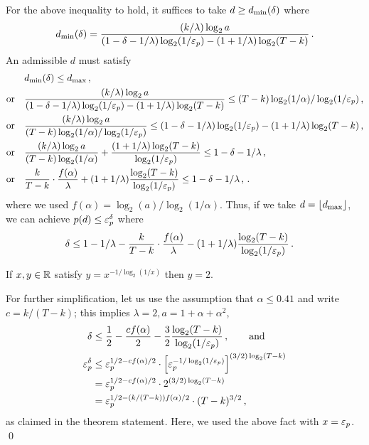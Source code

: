   For the above inequality to hold, 
  it suffices to take $d \geq d_\mathrm{min}(\delta)$ where 
  $$
    d_\mathrm{min}(\delta) = \frac{(k/\lambda) \log_2 a}{(1 - \delta - 1/\lambda) \log_2(1/\mathsf{\varepsilon}_p) - (1+1/\lambda) \log_2(T - k)}
    \,.
  $$
  An admissible $d$ must satisfy
  \begin{align*}
    &d_\mathrm{min}(\delta) \leq d_\mathrm{max} \,,\\
    \text{or}\quad &      
      \frac{(k/\lambda) \log_2 a}{(1 - \delta - 1/\lambda) \log_2(1/\mathsf{\varepsilon}_p) - (1+1/\lambda) \log_2(T - k)}
        \leq (T - k) \log_2(1/\alpha)/\log_2(1/\mathsf{\varepsilon}_p) \,,\\
    \text{or}\quad &      
      \frac{(k/\lambda) \log_2 a}{(T - k) \log_2(1/\alpha)/\log_2(1/\mathsf{\varepsilon}_p)} 
        \leq (1 - \delta - 1/\lambda) \log_2(1/\mathsf{\varepsilon}_p) - (1+1/\lambda) \log_2(T - k) \,,\\
    \text{or}\quad &      
      \frac{(k/\lambda) \log_2 a}{(T - k) \log_2(1/\alpha)} + \frac{(1+1/\lambda) \log_2(T - k)}{\log_2(1/\mathsf{\varepsilon}_p)}
        \leq 1 - \delta - 1/\lambda  \,,\\
    \text{or}\quad &      
      \frac{k}{T-k}\cdot \frac{f(\alpha)}{\lambda} + (1+1/\lambda) \frac{ \log_2(T - k)}{\log_2(1/\mathsf{\varepsilon}_p)}
        \leq 1 - \delta - 1/\lambda  \,,
        \,.
  \end{align*}
  where we used $f(\alpha) = \log_2(a)/\log_2(1/\alpha)$. 
  Thus, if we take $d = \lfloor d_\mathrm{max} \rfloor$, we can achieve  $p(d) \leq \mathsf{\varepsilon}_p^{\delta}$ 
  where 
  \begin{align}
    \delta
      &\leq 1 - 1/\lambda - \frac{k}{T-k}\cdot \frac{f(\alpha)}{\lambda} - (1+1/\lambda) \frac{ \log_2(T - k)}{\log_2(1/\mathsf{\varepsilon}_p)}\,. \label{eq:delta}    
  \end{align}


  \begin{fact*}
    If $x,y \in \mathbb{R}$ satisfy $y = x^{-1/\log_2(1/x)}$ then $y = 2$.
  \end{fact*}
  \noindent
  For further simplification, let us use the assumption that $\alpha \leq 0.41$ 
  and write $c = k/(T-k)$; 
  this implies $\lambda = 2, a = 1 + \alpha + \alpha^2$, 
  \begin{align*}
    \delta
      &\leq \frac{1}{2} - \frac{c f(\alpha)}{2} - \frac{3}{2} \frac{ \log_2(T - k)}{\log_2(1/\mathsf{\varepsilon}_p)}\,, 
      \qquad \text{and}\\
    \mathsf{\varepsilon}_p^\delta  
      &\leq \mathsf{\varepsilon}_p^{1/2 - c f(\alpha)/2} \cdot \left[ \mathsf{\varepsilon}_p^{-1/\log_2(1/\mathsf{\varepsilon}_p)} \right]^{(3/2)\log_2(T - k)} \\
      &= \mathsf{\varepsilon}_p^{1/2 - c f(\alpha)/2} \cdot 2^{(3/2)\log_2(T - k)} \\
      &= \mathsf{\varepsilon}_p^{1/2 - (k/(T-k)) f(\alpha)/2} \cdot (T - k)^{3/2} 
      \,,
  \end{align*}
  as claimed in the theorem statement. 
  Here, we used the above fact with $x = \mathsf{\varepsilon}_p$.  
\hfill\qed
